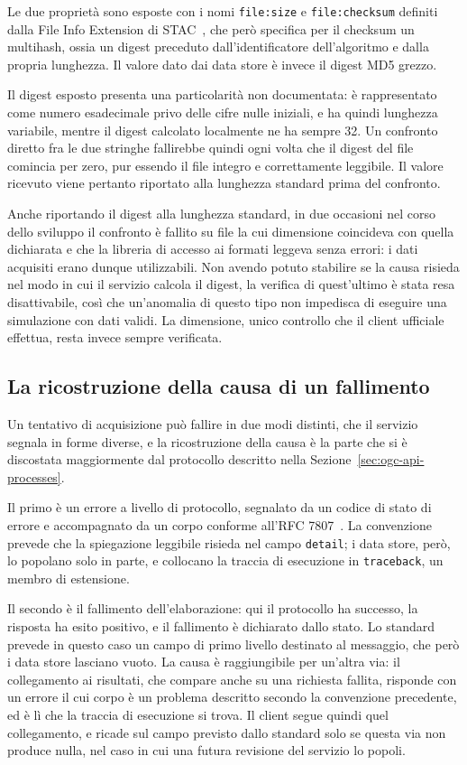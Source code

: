 Le due proprietà sono esposte con i nomi \texttt{file:size} e \texttt{file:checksum} definiti
dalla File Info Extension di STAC~\cite{stacfile}, che però specifica per il checksum
un multihash, ossia un digest preceduto dall'identificatore dell'algoritmo e dalla
propria lunghezza. Il valore dato dai data store è invece il digest MD5 grezzo.

Il digest esposto presenta una particolarità non documentata: è rappresentato come numero
esadecimale privo delle cifre nulle iniziali, e ha quindi lunghezza variabile, mentre il
digest calcolato localmente ne ha sempre 32. Un confronto diretto fra le due stringhe
fallirebbe quindi ogni volta che il digest del file comincia per zero, pur essendo il file
integro e correttamente leggibile. Il valore ricevuto viene pertanto riportato alla lunghezza
standard prima del confronto.

Anche riportando il digest alla lunghezza standard, in due occasioni nel corso dello sviluppo il confronto è
fallito su file la cui dimensione coincideva con quella dichiarata e che la libreria di
accesso ai formati leggeva senza errori: i dati acquisiti erano dunque utilizzabili. Non
avendo potuto stabilire se la causa risieda nel modo in cui il servizio calcola il digest,
la verifica di quest'ultimo è stata resa disattivabile, così che un'anomalia di
questo tipo non impedisca di eseguire una simulazione con dati validi. La dimensione,
unico controllo che il client ufficiale effettua, resta invece sempre verificata.

\subsection{La ricostruzione della causa di un fallimento}
\label{subsec:fallimenti-impl}

Un tentativo di acquisizione può fallire in due modi distinti, che il servizio segnala in
forme diverse, e la ricostruzione della causa è la parte che si è discostata
maggiormente dal protocollo descritto nella Sezione~\ref{sec:ogc-api-processes}.
 
Il primo è un errore a livello di protocollo, segnalato da un codice di stato di errore e
accompagnato da un corpo conforme all'RFC 7807~\cite{rfc7807}. La convenzione prevede che
la spiegazione leggibile risieda nel campo \texttt{detail}; i data store, però, lo popolano
solo in parte, e collocano la traccia di esecuzione in \texttt{traceback}, un membro di
estensione.
 
Il secondo è il fallimento dell'elaborazione: qui il protocollo ha successo, la risposta ha
esito positivo, e il fallimento è dichiarato dallo stato. Lo standard prevede in questo caso
un campo di primo livello destinato al messaggio, che però i data store lasciano vuoto. La
causa è raggiungibile per un'altra via: il collegamento ai risultati, che compare anche su
una richiesta fallita, risponde con un errore il cui corpo è un problema descritto secondo la
convenzione precedente, ed è lì che la traccia di esecuzione si trova. Il client segue quindi
quel collegamento, e ricade sul campo previsto dallo standard solo se questa via non produce
nulla, nel caso in cui una futura revisione del servizio lo popoli.
 
